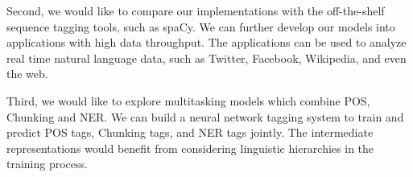 \documentclass{sfuthesis}
\begin{document}
Second, we would like to compare our implementations with the off-the-shelf sequence tagging tools, such as spaCy. We can further develop our models into applications with high data throughput. The applications can be used to analyze real time natural language data, such as Twitter, Facebook, Wikipedia, and even the web.

Third, we would like to explore multitasking models which combine POS, Chunking and NER. We can build a neural network tagging system to train and predict POS tags, Chunking tags, and NER tags jointly. The intermediate representations would benefit from considering linguistic hierarchies in the training process.



%
%
%
%
%

\cleardoublepage
{}
{}
%


	

\end{document}
